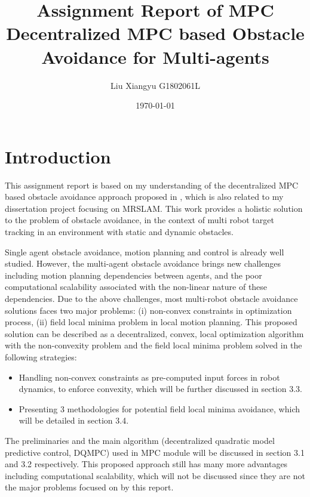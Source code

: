 \documentclass[letterpaper,12pt]{article}
\begin{document}
\title{Assignment Report of MPC\\
	 \large Decentralized MPC based Obstacle Avoidance for Multi-agents}
\author{Liu Xiangyu G1802061L}
\date{\today}
\maketitle

\section{Introduction}
This assignment report is based on my understanding of the decentralized MPC based obstacle avoidance approach proposed in \cite{tallamraju2018decentralized}, which is also related to my dissertation project focusing on MRSLAM. This work provides a holistic solution to the problem of obstacle avoidance, in the context of multi robot target tracking in an environment with static and dynamic obstacles.

Single agent obstacle avoidance, motion planning and control is already well studied. However, the multi-agent obstacle avoidance brings new challenges including motion planning dependencies between agents, and the poor computational scalability associated with the non-linear nature of these dependencies. Due to the above challenges, most multi-robot obstacle avoidance solutions faces two major problems: (i) non-convex constraints in optimization process, (ii) field local minima problem in local motion planning. This proposed solution can be described as a decentralized, convex, local optimization algorithm with the non-convexity problem and the field local minima problem solved in the following strategies:

\begin{itemize}
\item Handling non-convex constraints as pre-computed input forces in robot dynamics, to enforce convexity, which will be further discussed in section 3.3.
\item Presenting 3 methodologies for potential field local minima avoidance, which will be detailed in section 3.4.
\end{itemize}

The preliminaries and the main algorithm (decentralized quadratic model predictive control, DQMPC) used in MPC module will be discussed in section 3.1 and 3.2 respectively. This proposed approach still has many more advantages including computational scalability, which will not be discussed since they are not the major problems focused on by this report.
\end{document}
